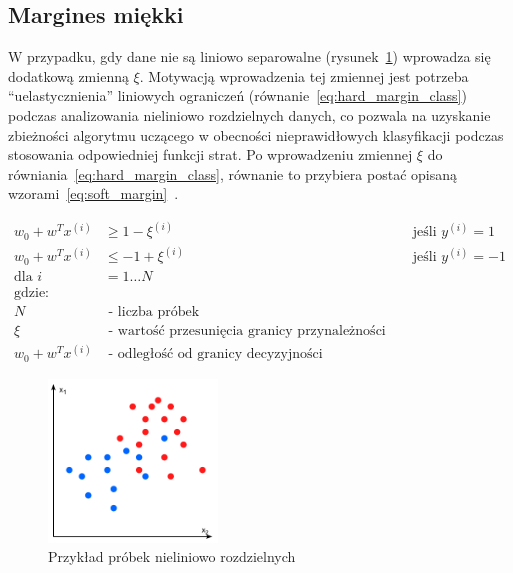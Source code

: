 \pagebreak

\subsection{Margines miękki}

W przypadku, gdy dane nie są liniowo separowalne (rysunek~\ref{fig:sofm_margin}) wprowadza się dodatkową zmienną $\xi$.
Motywacją wprowadzenia tej zmiennej jest potrzeba ``uelastycznienia'' liniowych
ograniczeń (równanie~\ref{eq:hard_margin_class}) podczas analizowania nieliniowo rozdzielnych danych,
co pozwala na uzyskanie zbieżności algorytmu uczącego w obecności nieprawidłowych klasyfikacji
podczas stosowania odpowiedniej funkcji strat.
Po wprowadzeniu zmiennej $\xi$ do równiania~\ref{eq:hard_margin_class},
równanie to przybiera postać opisaną wzorami~\ref{eq:soft_margin}~\cite{raschka2017python}.

\begin{equation}
    \begin{aligned}
        w_0 +w^{T}x^{(i)} &\geq 1 - \xi^{(i)} && \text{ jeśli } y^{(i)} =1
        \\
        w_0 +w^{T}x^{(i)} &\leq -1 + \xi^{(i)} && \text{ jeśli } y^{(i)} =-1
        \\
        \text{dla } i&= 1\dots N \\
        \text{gdzie:} \\
        N & \text{  - liczba próbek} \\
        \xi & \text{ - wartość przesunięcia granicy przynależności} \\
        w_0 +w^{T}x^{(i)} & \text{  - odległość od granicy decyzyjności}
    \end{aligned}
    \label{eq:soft_margin}
\end{equation}

\bigskip

\begin{figure}[H]
    \centering
    \includegraphics[width=0.4\textwidth]{images/soft-margin.drawio}
    \caption{ Przykład próbek nieliniowo rozdzielnych }
    \customsource
    \label{fig:sofm_margin}
\end{figure}

